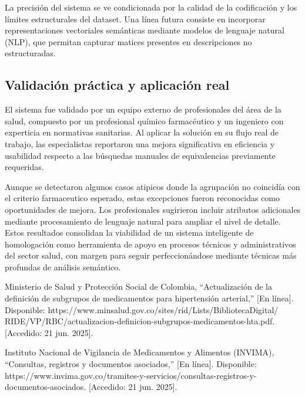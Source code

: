 \documentclass[conference]{IEEEtran}
\begin{document}
La precisión del sistema se ve condicionada por la calidad de la codificación y los límites estructurales del dataset. Una línea futura consiste en incorporar representaciones vectoriales semánticas mediante modelos de lenguaje natural (NLP), que permitan capturar matices presentes en descripciones no estructuradas.

\subsection{Validación práctica y aplicación real}

El sistema fue validado por un equipo externo de profesionales del área de la salud, compuesto por un profesional químico farmacéutico y un ingeniero con experticia en normativas sanitarias. Al aplicar la solución en su flujo real de trabajo, las especialistas reportaron una mejora significativa en eficiencia y usabilidad respecto a las búsquedas manuales de equivalencias previamente requeridas.

Aunque se detectaron algunos casos atipicos donde la agrupación no coincidía con el criterio farmaceutico esperado, estas excepciones fueron reconocidas como oportunidades de mejora. Los profesionales sugirieron incluir atributos adicionales mediante procesamiento de lenguaje natural para ampliar el nivel de detalle. Estos resultados consolidan la viabilidad de un sistema inteligente de homologación como herramienta de apoyo en procesos técnicos y administrativos del sector salud, con margen para seguir perfeccionándose mediante técnicas más profundas de análisis semántico.


\begin{thebibliography}{00}
    
 Ministerio de Salud y Protección Social de Colombia, ``Actualización de la definición de subgrupos de medicamentos para hipertensión arterial,'' [En línea]. Disponible: https://www.minsalud.gov.co/sites/rid/Lists/BibliotecaDigital/
RIDE/VP/RBC/actualizacion-definicion-subgrupos-medicamentos-hta.pdf. [Accedido: 21 jun. 2025].

 Instituto Nacional de Vigilancia de Medicamentos y Alimentos (INVIMA), ``Consultas, registros y documentos asociados,'' [En línea]. Disponible: https://www.invima.gov.co/tramites-y-servicios/consultas-registros-y-documentos-asociados. [Accedido: 21 jun. 2025].


\end{thebibliography}
\end{document}
